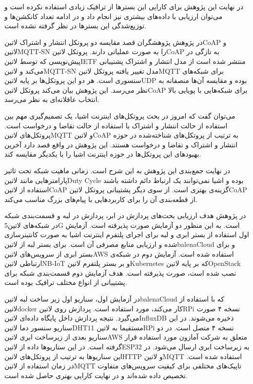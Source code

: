 در نهایت این پژوهش برای کارایی این بسترها
از ترافیک زیادی استفاده نکرده است و می‌توان ارزیابی با داده‌های بیشتری نیز انجام داد و در ادامه تعداد کانکشن‌ها و توزیع‌شدگی این بسترها در نظر گرفته نشده است.


در پژوهش  پژوهشگران قصد مقایسه دو پروتکل انتشار و اشتراک ‌لاتین{CoAP} و ‌لاتین{MQTT-SN} را به صورت عملیاتی دارند.
پروتکل ‌لاتین{CoAP} به تازگی در پیش‌نویسی که توسط ‌لاتین{IETF} منتشر شده است از مدل انتشار و اشتراک پشتیبانی می‌کند و ‌لاتین{MQTT-SN}
مدل تغییر یافته پروتکل ‌لاتین{MQTT} برای شبکه‌های سنسوری است. هر دو این پروتکل‌ها بر پایه ‌لاتین{UDP} بوده و مقایسه آن‌ها منصفانه به نظر می‌رسد.
این پژوهش بیان می‌کند پروتکل ‌لاتین{CoAP} برای شبکه‌هایی با پویایی بالا انتخاب عاقلانه‌ای به نظر می‌رسد.

می‌توان گفت که امروز در بحث پروتکل‌های اینترنت اشیا، یک تصمیم‌گیری مهم بین استفاده از حالت انتشار و اشتراک یا استفاده از حالت تقاضا و درخواست است.
پروتکل‌های ‌لاتین{MQTT} و ‌لاتین{CoAP} به ترتیب از پروتکل‌های شناخته‌شده در حوزه انتشار و اشتراک و تقاضا و درخواست هستند.
این پژوهش در واقع قصد دارد آخرین بهبودهای این پروتکل‌ها در حوزه اینترنت اشیا را با یکدیگر مقایسه کند.

در نهایت جمع‌بندی این پژوهش به این شرح است. زمانی ماهیت شبکه تحت ثاثیر پارامترهایی مانند ‌لاتین{Duty Cycle} بوده
و اشیا نمی‌توانند یک ارتباط دائم داشته باشند استفاده از ‌لاتین{CoAP} گزینه‌ی بهتری است. از سوی دیگر پشتیبانی پروتکل
‌لاتین{CoAP} از قطعه‌بندی آن را برای کاربردهایی با پیام‌های بزرگ مناسب می‌کند.


در پژوهش  هدف ارزیابی بحث‌های پردازش در ابر، پردازش در لبه و قسمت‌بندی شبکه در شبکه‌های ‌لاتین{5G} است.
به این منظور دو آزمایش صورت پذیرفته است. آزمایش اول استفاده از بستر ابری و لبه برای اجرای پلتفرم اینترنت اشیا
به صورت کانتینرسازی شده و ارزیابی منابع مصرفی آن است. برای بستر لبه از ‌لاتین{balenaCloud} و برای بستر ابری از سرویس‌های ‌لاتین{AWS}
استفاده شده است.
آزمایش دوم در شبکه‌ی ارتباطی ‌لاتین{NB-IoT} و بر بستر
پلتفرم ‌لاتین{Kubernetes} که بر پایه ‌لاتین{OpenStack} نصب شده است، صورت پذیرفته است.
هدف آزمایش دوم قسمت‌بندی شبکه برای پشتیبانی از انواع مختلف ترافیک بوده است.

در آزمایش اول، سناریو اول زیر ساخت لبه ‌لاتین{balenaCloud} که با استفاده از ‌لاتین{docker}
کار می‌کند، مورد استفاده است. پردازش روی ‌لاتین{RPi} نسخه ۴ صورت می‌گیرد. نتیجه پردازش داخل پایگاه داده‌ای
‌لاتین{InfluxDB} ذخیره می‌شوند. در این سناریو سنسور دما ‌لاتین{DHT11} مستقیما
به ‌لاتین{RPi} نسخه ۴ متصل است.
در دو سناریو بعدی از زیرساخت ابری ‌لاتین{AWS} متعلق به شرکت آمازون مورد استفاده قرار گرفته است.
در این سناریوها داده از ‌لاتین{ESP32} به زیرساخت ابری ارسال می‌شود. در این سناریوها به ترتیب
از پروتکل‌های ‌لاتین{HTTP} و ‌لاتین{MQTT} استفاده شده است.
در زمان استفاده از ‌لاتین{MQTT} تاپیک‌های مختلفی برای کیفیت سرویس‌های متفاوت تخصیص داده
شده‌اند و در نهایت کارایی بهتری حاصل شده است.

